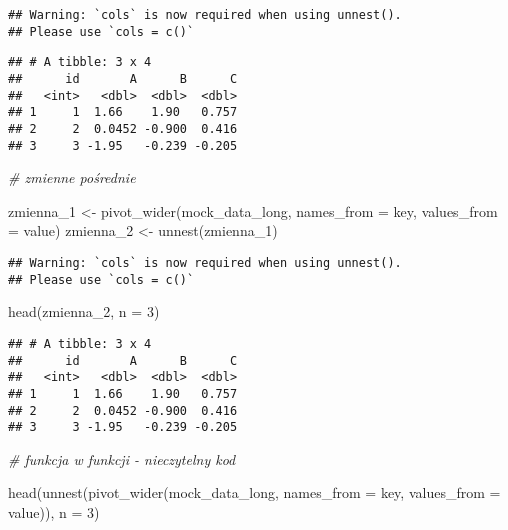 \documentclass[
]{book}
\newenvironment{Shaded}{\begin{snugshade}}{\end{snugshade}}
\newcommand{\AttributeTok}[1]{\textcolor[rgb]{0.77,0.63,0.00}{#1}}
\newcommand{\CommentTok}[1]{\textcolor[rgb]{0.56,0.35,0.01}{\textit{#1}}}
\newcommand{\DecValTok}[1]{\textcolor[rgb]{0.00,0.00,0.81}{#1}}
\newcommand{\FunctionTok}[1]{\textcolor[rgb]{0.00,0.00,0.00}{#1}}
\newcommand{\NormalTok}[1]{#1}
\newcommand{\OtherTok}[1]{\textcolor[rgb]{0.56,0.35,0.01}{#1}}
\begin{document}
\begin{verbatim}
## Warning: `cols` is now required when using unnest().
## Please use `cols = c()`
\end{verbatim}

\begin{verbatim}
## # A tibble: 3 x 4
##      id       A      B      C
##   <int>   <dbl>  <dbl>  <dbl>
## 1     1  1.66    1.90   0.757
## 2     2  0.0452 -0.900  0.416
## 3     3 -1.95   -0.239 -0.205
\end{verbatim}

\begin{Shaded}
\begin{Highlighting}[]
\CommentTok{\# zmienne pośrednie}

\NormalTok{zmienna\_1 }\OtherTok{\textless{}{-}} \FunctionTok{pivot\_wider}\NormalTok{(mock\_data\_long, }\AttributeTok{names\_from =}\NormalTok{ key, }\AttributeTok{values\_from =}\NormalTok{ value) }
\NormalTok{zmienna\_2 }\OtherTok{\textless{}{-}} \FunctionTok{unnest}\NormalTok{(zmienna\_1)}
\end{Highlighting}
\end{Shaded}

\begin{verbatim}
## Warning: `cols` is now required when using unnest().
## Please use `cols = c()`
\end{verbatim}

\begin{Shaded}
\begin{Highlighting}[]
\FunctionTok{head}\NormalTok{(zmienna\_2, }\AttributeTok{n =} \DecValTok{3}\NormalTok{)}
\end{Highlighting}
\end{Shaded}

\begin{verbatim}
## # A tibble: 3 x 4
##      id       A      B      C
##   <int>   <dbl>  <dbl>  <dbl>
## 1     1  1.66    1.90   0.757
## 2     2  0.0452 -0.900  0.416
## 3     3 -1.95   -0.239 -0.205
\end{verbatim}

\begin{Shaded}
\begin{Highlighting}[]
\CommentTok{\# funkcja w funkcji {-} nieczytelny kod}

\FunctionTok{head}\NormalTok{(}\FunctionTok{unnest}\NormalTok{(}\FunctionTok{pivot\_wider}\NormalTok{(mock\_data\_long, }\AttributeTok{names\_from =}\NormalTok{ key, }\AttributeTok{values\_from =}\NormalTok{ value)), }\AttributeTok{n =} \DecValTok{3}\NormalTok{)}
\end{Highlighting}
\end{Shaded}
\end{document}
